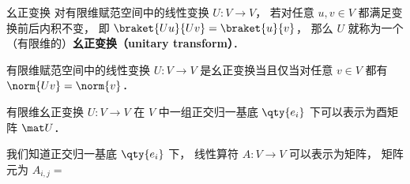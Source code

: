 
\begin{issues}
\issueDraft
\end{issues}


\begin{definition}{幺正变换}
对有限维赋范空间中的线性变换 $U: V\to V$， 若对任意 $u, v \in V$ 都满足变换前后内积不变， 即 $\braket{Uu}{Uv} = \braket{u}{v}$， 那么 $U$ 就称为一个（有限维的）\textbf{幺正变换（unitary transform）}．
\end{definition}

\begin{theorem}{}
有限维赋范空间中的线性变换 $U: V\to V$ 是幺正变换当且仅当对任意 $v\in V$ 都有 $\norm{Uv} = \norm{v}$．
\end{theorem}

\begin{theorem}{}
有限维幺正变换 $U: V\to V$ 在 $V$ 中一组正交归一基底 $\qty{e_i}$ 下可以表示为酉矩阵 $\mat U$．
\end{theorem}
我们知道正交归一基底 $\qty{e_i}$ 下， 线性算符 $A:V\to V$ 可以表示为矩阵， 矩阵元为 $A_{i,j} = $
